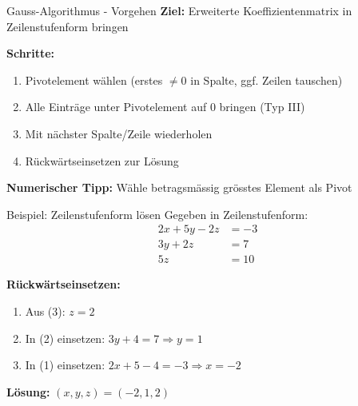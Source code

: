 \documentclass[a4paper, fontsize=7pt]{scrartcl}
\begin{document}
\begin{mainbox}{Gauss-Algorithmus - Vorgehen}
\textbf{Ziel:} Erweiterte Koeffizientenmatrix in Zeilenstufenform bringen

\textbf{Schritte:}
\begin{enumerate}
    \item Pivotelement wählen (erstes $\neq 0$ in Spalte, ggf. Zeilen tauschen)
    \item Alle Einträge unter Pivotelement auf 0 bringen (Typ III)
    \item Mit nächster Spalte/Zeile wiederholen
    \item Rückwärtseinsetzen zur Lösung
\end{enumerate}

\textbf{Numerischer Tipp:} Wähle betragsmässig grösstes Element als Pivot
\end{mainbox}

\begin{subbox}{Beispiel: Zeilenstufenform lösen}
Gegeben in Zeilenstufenform:
\begin{align*}
2x + 5y - 2z &= -3 \\
3y + 2z &= 7 \\
5z &= 10
\end{align*}

\textbf{Rückwärtseinsetzen:}
\begin{enumerate}
    \item Aus (3): $z = 2$
    \item In (2) einsetzen: $3y + 4 = 7 \Rightarrow y = 1$
    \item In (1) einsetzen: $2x + 5 - 4 = -3 \Rightarrow x = -2$
\end{enumerate}

\textbf{Lösung:} $(x, y, z) = (-2, 1, 2)$
\end{subbox}
\end{document}
